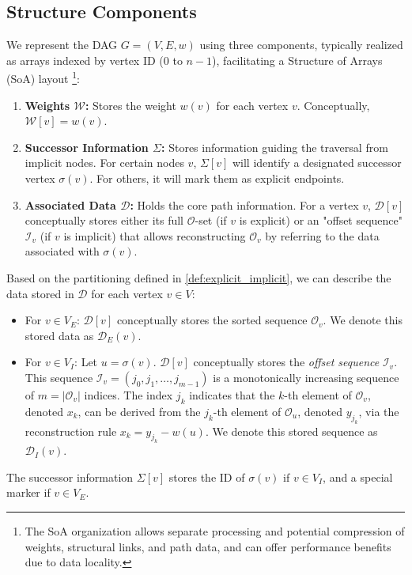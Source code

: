\subsection{Structure Components}
\label{subsec:structure_components}

We represent the DAG $G=(V,E,w)$ using three components, typically realized as arrays indexed by vertex ID ($0$ to $n-1$), facilitating a Structure of Arrays (SoA) layout \footnote{The SoA organization allows separate processing and potential compression of weights, structural links, and path data, and can offer performance benefits due to data locality.}:

\begin{enumerate}
    \item \textbf{Weights $\mathcal{W}$:} Stores the weight $w(v)$ for each vertex $v$. Conceptually, $\mathcal{W}[v] = w(v)$.
    \item \textbf{Successor Information $\Sigma$:} Stores information guiding the traversal from implicit nodes. For certain nodes $v$, $\Sigma[v]$ will identify a designated successor vertex $\sigma(v)$. For others, it will mark them as explicit endpoints.
    \item \textbf{Associated Data $\mathcal{D}$:} Holds the core path information. For a vertex $v$, $\mathcal{D}[v]$ conceptually stores either its full $\mathcal{O}$-set (if $v$ is explicit) or an "offset sequence" $\mathcal{I}_v$ (if $v$ is implicit) that allows reconstructing $\mathcal{O}_v$ by referring to the data associated with $\sigma(v)$.
\end{enumerate}

Based on the partitioning defined in \ref{def:explicit_implicit}, we can describe the data stored in $\mathcal{D}$ for each vertex $v \in V$:

\begin{itemize}
    \item For $v \in V_E$: $\mathcal{D}[v]$ conceptually stores the sorted sequence $\mathcal{O}_v$. We denote this stored data as $\mathcal{D}_E(v)$.
    \item For $v \in V_I$: Let $u = \sigma(v)$. $\mathcal{D}[v]$ conceptually stores the \emph{offset sequence} $\mathcal{I}_v$. This sequence $\mathcal{I}_v = (j_0, j_1, \dots, j_{m-1})$ is a monotonically increasing sequence of $m = |\mathcal{O}_v|$ indices. The index $j_k$ indicates that the $k$-th element of $\mathcal{O}_v$, denoted $x_k$, can be derived from the $j_k$-th element of $\mathcal{O}_u$, denoted $y_{j_k}$, via the reconstruction rule $x_k = y_{j_k} - w(u)$. We denote this stored sequence as $\mathcal{D}_I(v)$.
\end{itemize}
The successor information $\Sigma[v]$ stores the ID of $\sigma(v)$ if $v \in V_I$, and a special marker if $v \in V_E$.

